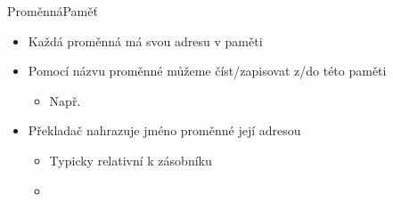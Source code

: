\begin{frame}{Proměnná}{Paměť}

  \begin{itemize}
    \item Každá proměnná má svou adresu v paměti

    \pause

    \item Pomocí názvu proměnné můžeme číst/zapisovat z/do této paměti
    \begin{itemize}
      \item Např. 
    \end{itemize}

    \pause

    \item Překladač nahrazuje jméno proměnné její adresou
    \begin{itemize}
      \item Typicky relativní k zásobníku
      \item {}
    \end{itemize}
  \end{itemize}

\end{frame}

